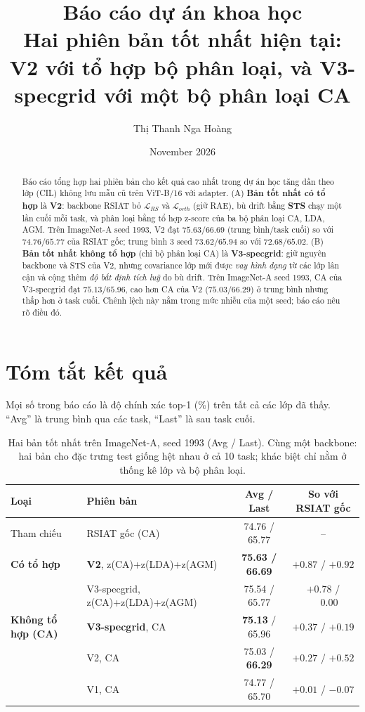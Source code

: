 \documentclass[11pt]{article}
\title{Báo cáo dự án khoa học\\[4pt]
\large Hai phiên bản tốt nhất hiện tại:\\
V2 với tổ hợp bộ phân loại, và V3-specgrid với một bộ phân loại CA}
\author{Thị Thanh Nga Hoàng}
\date{November 2026}
\begin{document}
\maketitle

\begin{abstract}
Báo cáo tổng hợp hai phiên bản cho kết quả cao nhất trong dự án học tăng dần theo lớp (CIL) không lưu mẫu cũ trên
ViT-B/16 với adapter. (A) \textbf{Bản tốt nhất có tổ hợp} là \textbf{V2}: backbone RSIAT bỏ $\mathcal{L}_{RS}$ và
$\mathcal{L}_{orth}$ (giữ RAE), bù drift bằng \textbf{STS} chạy một lần cuối mỗi task, và phân loại bằng tổ hợp z-score
của ba bộ phân loại CA, LDA, AGM. Trên ImageNet-A seed 1993, V2 đạt $75.63/66.69$ (trung bình/task cuối) so với
$74.76/65.77$ của RSIAT gốc; trung bình 3 seed $73.62/65.94$ so với $72.68/65.02$. (B) \textbf{Bản tốt nhất không tổ hợp}
(chỉ bộ phân loại CA) là \textbf{V3-specgrid}: giữ nguyên backbone và STS của V2, nhưng covariance lớp mới được
\emph{vay hình dạng} từ các lớp lân cận và cộng thêm \emph{độ bất định tích luỹ} do bù drift. Trên ImageNet-A seed 1993,
CA của V3-specgrid đạt $75.13/65.96$, cao hơn CA của V2 ($75.03/66.29$) ở trung bình nhưng thấp hơn ở task cuối. Chênh lệch
này nằm trong mức nhiễu của một seed; báo cáo nêu rõ điều đó.
\end{abstract}

\tableofcontents
\newpage

\section{Tóm tắt kết quả}\label{sec:summary}

Mọi số trong báo cáo là độ chính xác top-1 (\%) trên tất cả các lớp đã thấy. ``Avg'' là trung bình qua các task, ``Last''
là sau task cuối.

\begin{table}[H]
\centering\small
\caption{Hai bản tốt nhất trên ImageNet-A, seed 1993 (Avg / Last). Cùng một backbone: hai bản cho đặc trưng test giống
hệt nhau ở cả 10 task; khác biệt chỉ nằm ở thống kê lớp và bộ phân loại.}
\label{tab:summary}
\begin{tabular}{llcc}
\toprule
Loại & Phiên bản & Avg / Last & So với RSIAT gốc \\
\midrule
Tham chiếu & RSIAT gốc (CA) & 74.76 / 65.77 & -- \\
\midrule
\textbf{Có tổ hợp} & \textbf{V2}, z(CA)+z(LDA)+z(AGM) & \textbf{75.63 / 66.69} & $+0.87$ / $+0.92$ \\
 & V3-specgrid, z(CA)+z(LDA)+z(AGM) & 75.54 / 65.77 & $+0.78$ / $\phantom{+}0.00$ \\
\midrule
\textbf{Không tổ hợp (CA)} & \textbf{V3-specgrid}, CA & \textbf{75.13} / 65.96 & $+0.37$ / $+0.19$ \\
 & V2, CA & 75.03 / \textbf{66.29} & $+0.27$ / $+0.52$ \\
 & V1, CA & 74.77 / 65.70 & $+0.01$ / $-0.07$ \\
\bottomrule
\end{tabular}
\end{table}
\end{document}
